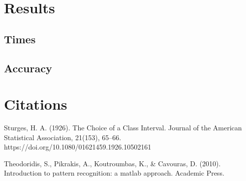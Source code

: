 \documentclass[12pt, a4paper]{article}
\begin{document}
\section{Results}

\subsection{Times}

\subsection{Accuracy}

\section{Citations}

Sturges, H. A. (1926). The Choice of a Class Interval. Journal of the American Statistical Association, 21(153), 65–66. https://doi.org/10.1080/01621459.1926.10502161
\newline

Theodoridis, S., Pikrakis, A., Koutroumbas, K., & Cavouras, D. (2010). Introduction to pattern recognition: a matlab approach. Academic Press.
\newline
\end{document}
